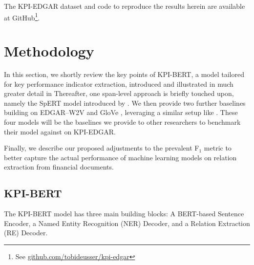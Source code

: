 \documentclass[conference, table]{IEEEtran}
\newcommand{\1} {\mathbbm{1}}
\begin{document}
The KPI-EDGAR dataset and code to reproduce the results herein are available at GitHub\footnote{See \href{https://github.com/tobideusser/kpi-edgar}{github.com/tobideusser/kpi-edgar}}.

\section{Methodology}
\label{section:methodology}

In this section, we shortly review the key points of KPI-BERT, a model tailored for key performance indicator extraction, introduced and illustrated in much greater detail in \cite{kpi-bert}
Thereafter, one span-level approach is briefly touched upon, namely the SpERT model introduced by \cite{eberts2019span}. 
We then provide two further baselines building on EDGAR--W2V \cite{loukas2021edgar} and GloVe \cite{pennington2014glove}, leveraging a similar setup like \cite{kpi-bert}.
These four models will be the baselines we provide to other researchers to benchmark their model against on KPI-EDGAR.

Finally, we describe our proposed adjustments to the prevalent F$_1$ metric to better capture the actual performance of machine learning models on relation extraction from financial documents.

\subsection{KPI-BERT}
\label{subsection:kpibert}

The KPI-BERT \cite{kpi-bert} model has three main building blocks: A BERT-based Sentence Encoder, a Named Entity Recognition (NER) Decoder, and a Relation Extraction (RE) Decoder.
\end{document}
